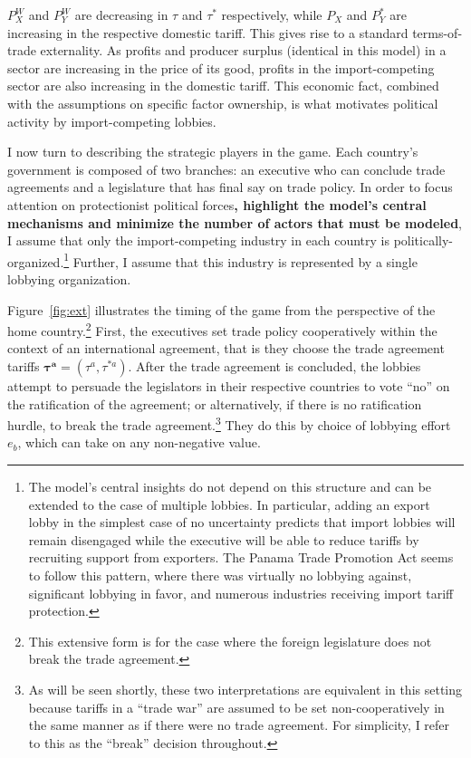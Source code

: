 \documentclass[10pt]{article}
\newcommand{\bta}{\bm{\tau^a}}
\begin{document}
$P_X^W$ and $P_Y^W$ are decreasing in $\tau$ and $\tau^*$ respectively, while $P_X$ and $P_Y^*$ are increasing in the respective domestic tariff. This gives rise to a standard terms-of-trade externality. As profits and producer surplus (identical in this model) in a sector are increasing in the price of its good, profits in the import-competing sector are also increasing in the domestic tariff. This economic fact, combined with the assumptions on specific factor ownership, is what motivates political activity by import-competing lobbies.

I now turn to describing the strategic players in the game. Each country's government is composed of two branches: an executive who can conclude trade agreements and a legislature that has final say on trade policy. In order to focus attention on protectionist political forces\textbf{, highlight the model's central mechanisms and minimize the number of actors that must be modeled}, I assume that only the import-competing industry in each country is politically-organized.\footnote{The model's central insights do not depend on this structure and can be extended to the case of multiple lobbies. In particular, adding an export lobby in the simplest case of no uncertainty predicts that import lobbies will remain disengaged while the executive will be able to reduce tariffs by recruiting support from exporters. The Panama Trade Promotion Act seems to follow this pattern, where there was virtually no lobbying against, significant lobbying in favor, and numerous industries receiving import tariff protection.\label{fn:lobby}} Further, I assume that this industry is represented by a single lobbying organization.

Figure~\ref{fig:ext} illustrates the timing of the game from the perspective of the home country.\footnote{This extensive form is for the case where the foreign legislature does not break the trade agreement.} First, the executives set trade policy cooperatively within the context of an international agreement, that is they choose the trade agreement tariffs $\bta = \left(\tau^a,\tau^{*a}\right)$. After the trade agreement is concluded, the lobbies attempt to persuade the legislators in their respective countries to vote ``no'' on the ratification of the agreement; or alternatively, if there is no ratification hurdle, to break the trade agreement.\footnote{As will be seen shortly, these two interpretations are equivalent in this setting because tariffs in a ``trade war'' are assumed to be set non-cooperatively in the same manner as if there were no trade agreement. For simplicity, I refer to this as the ``break'' decision throughout.} They do this by choice of lobbying effort $e_b$, which can take on any non-negative value.
\end{document}
